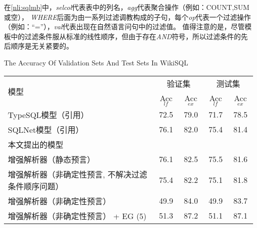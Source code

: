   在\ref{nli:sqlmb}中，\emph{selcol}代表表中的列名，\emph{agg}代表聚合操作（例如：COUNT,SUM或空），
  \emph{WHERE}后面为由一系列过滤调教构成的子句，每个\emph{op}代表一个过滤操作（例如：“=”），\emph{val}代表出现在自然语言问句中的过滤值。
  值得注意的是，尽管模板中的过滤条件服从标准的线性顺序，但由于存在\emph{AND}符号，所以过滤条件的先后顺序是无关紧要的。

\begin{table}[!htpb]
    {The Accuracy Of Validation Sets And Test Sets In WikiSQL}
  \label{tab:wzyzjhcsjdzqd}
  \centering
  \begin{threeparttable}[b]
     \begin{tabular}{lcccc}
      \toprule
      \multirow{2}{10mm}{模型}&\multicolumn{2}{c}{验证集} & \multicolumn{2}{c}{测试集}\\
      \cmidrule(lr){2-3}\cmidrule(lr){4-5}
      & Acc$_{lf}$ & Acc$_{ex}$ & Acc$_{lf}$ & Acc$_{ex}$\\
      \midrule
      TypeSQL模型（引用） & 72.5 & 79.0 & 71.7 & 78.5\\
      SQLNet模型（引用） & 76.1 & 82.0 & 75.4 & 81.4\\
      \midrule 
      本文提出的模型 &  &  &  & \\
      增强解析器（静态预言） & 76.1 & 82.5 & 75.5 & 81.6\\
      增强解析器（非确定性预言, 不解决过滤条件顺序问题） & 75.4 & 82.2 & 75.1 & 81.8\\
      增强解析器（非确定性预言） & 49.9 & 84.0 & 49.9 & 83.7\\
      增强解析器（非确定性预言） + EG (5) & 51.3 & 87.2 & 51.1 & 87.1\\

\end{tabular}
\end{threeparttable}
\end{table}
